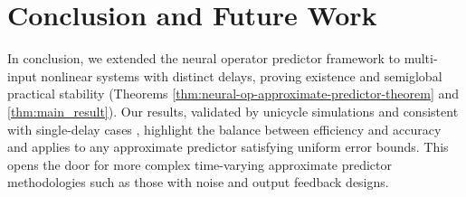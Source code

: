 \documentclass[letterpaper, 10 pt, conference]{ieeeconf}  %
\begin{document}
\section{Conclusion and Future Work}
In conclusion, we extended the neural operator predictor framework to multi-input nonlinear systems with distinct delays, proving existence and semiglobal practical stability (Theorems \ref{thm:neural-op-approximate-predictor-theorem} and \ref{thm:main_result}). Our results, validated by unicycle simulations and consistent with single-delay cases \cite{Luke_Peijia:2025}, highlight the balance between efficiency and accuracy and applies to any approximate predictor satisfying uniform error bounds. This opens the door for more complex time-varying approximate predictor methodologies such as those with noise and output feedback designs. 


\end{document}
